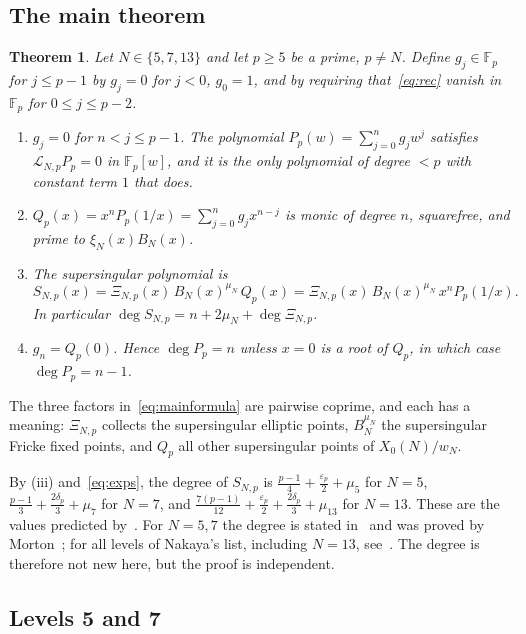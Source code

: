 \documentclass[11pt,a4paper]{article}
\newtheorem{theorem}{Theorem}[section]
\theoremstyle{definition}
\theoremstyle{remark}
\newcommand{\F}{\mathbb{F}}
\newcommand{\cL}{\mathcal{L}}
\numberwithin{equation}{section}
\begin{document}
\subsection{The main theorem}

\begin{theorem}\label{thm:uniform}
Let $N\in\{5,7,13\}$ and let $p\ge5$ be a prime, $p\ne N$. Define $g_j\in\F_p$
for $j\le p-1$ by $g_j=0$ for $j<0$, $g_0=1$, and by requiring
that~\eqref{eq:rec} vanish in $\F_p$ for $0\le j\le p-2$.
\begin{enumerate}
\item[(i)] $g_j=0$ for $n<j\le p-1$. The polynomial $P_p(w)=\sum_{j=0}^{n}g_jw^j$
satisfies $\cL_{N,p}P_p=0$ in $\F_p[w]$, and it is the only polynomial of
degree $<p$ with constant term $1$ that does.
\item[(ii)] $Q_p(x)=x^nP_p(1/x)=\sum_{j=0}^{n}g_jx^{n-j}$ is monic of degree
$n$, squarefree, and prime to $\xi_N(x)B_N(x)$.
\item[(iii)] The supersingular polynomial is
\begin{equation}\label{eq:mainformula}
S_{N,p}(x)=\Xi_{N,p}(x)\,B_N(x)^{\mu_N}\,Q_p(x)
=\Xi_{N,p}(x)\,B_N(x)^{\mu_N}\,x^{n}P_p(1/x) .
\end{equation}
In particular $\deg S_{N,p}=n+2\mu_N+\deg\Xi_{N,p}$.
\item[(iv)] $g_n=Q_p(0)$. Hence $\deg P_p=n$ unless $x=0$ is a root of $Q_p$,
in which case $\deg P_p=n-1$.
\end{enumerate}
\end{theorem}

The three factors in~\eqref{eq:mainformula} are pairwise coprime, and each has
a meaning: $\Xi_{N,p}$ collects the supersingular elliptic points, $B_N^{\mu_N}$
the supersingular Fricke fixed points, and $Q_p$ all other supersingular
points of $X_0(N)/w_N$.

By (iii) and~\eqref{eq:exps}, the degree of $S_{N,p}$ is
$\frac{p-1}4+\frac{\varepsilon_p}2+\mu_5$ for $N=5$,
$\frac{p-1}3+\frac{2\delta_p}3+\mu_7$ for $N=7$, and
$\frac{7(p-1)}{12}+\frac{\varepsilon_p}2+\frac{2\delta_p}3+\mu_{13}$ for $N=13$.
These are the values predicted by~\cite[Conjecture~6]{Nakaya19}. For $N=5,7$
the degree is stated in~\cite[Remark~5.3]{Sakai14} and was proved by
Morton~\cite{Morton23}; for all levels of Nakaya's list, including $N=13$,
see~\cite{JordanNakaya}. The degree is therefore not new here, but the proof
is independent.

\subsection{Levels 5 and 7}
\end{document}
